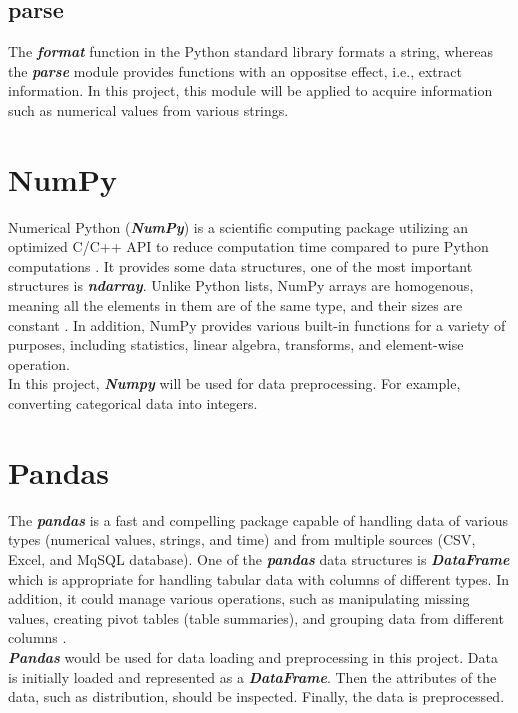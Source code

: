 \documentclass[12pt,twoside]{report}
\begin{document}
\subsection{parse}
The \textit{\textbf{format}} function in the Python standard library formats a string, whereas the \textit{\textbf{parse}} module provides functions with an oppositse effect, i.e., extract information. In this project, this module will be applied to acquire information such as numerical values from various strings.

\section{NumPy}
Numerical Python (\textit{\textbf{NumPy}}) is a scientific computing package utilizing an optimized C/C++ API to reduce computation time compared to pure Python computations \citep{RN6}. It provides some data structures, one of the most important structures is \textbf{\emph{ndarray}}. Unlike Python lists, NumPy arrays are homogenous, meaning all the elements in them are of the same type, and their sizes are constant \citep{RN4}.  In addition, NumPy provides various built-in functions for a variety of purposes, including statistics, linear algebra,  transforms, and element-wise operation. 
\\

In this project, \textit{\textbf{Numpy}} will be used for data preprocessing. For example, converting categorical data into integers.

\section{Pandas}
The \textbf{\textit{pandas}} is a fast and compelling package capable of handling data of various types (numerical values, strings, and time) and from multiple sources (CSV, Excel, and MqSQL database). One of the \textbf{\textit{pandas}} data structures is \textbf{\textit{DataFrame}} which is appropriate for handling tabular data with columns of different types. In addition, it could manage various operations, such as manipulating missing values, creating pivot tables (table summaries), and grouping data from different columns \citep{RN4}. 
\\

\textbf{\textit{Pandas}} would be used for data loading and preprocessing in this project. Data is initially loaded and represented as a \textbf{\textit{DataFrame}}. Then the attributes of the data, such as distribution, should be inspected. Finally, the data is preprocessed.
\end{document}
